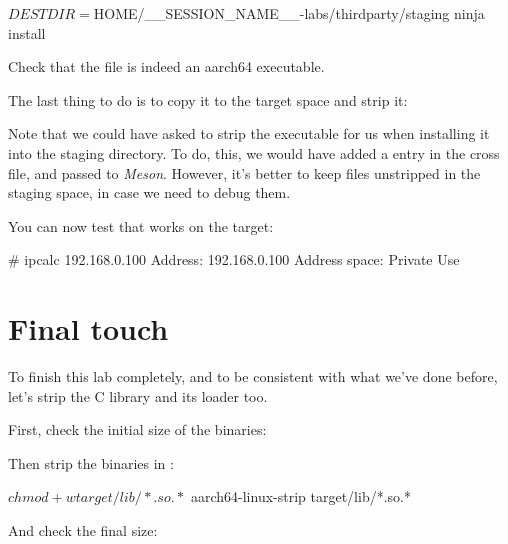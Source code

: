 \begin{bashinput}
$ DESTDIR=$HOME/__SESSION_NAME__-labs/thirdparty/staging ninja install
\end{bashinput}

Check that the  file is indeed an aarch64
executable.

The last thing to do is to copy it to the target space and strip it:


Note that we could have asked  to strip the
executable for us when installing it into the staging directory.
To do, this, we would have added a  entry in the cross file,
and passed  to {\em Meson}. However, it's better to keep
files unstripped in the staging space, in case we need to debug them.

You can now test that  works on the target:

\begin{bashinput}
# ipcalc 192.168.0.100
Address:	192.168.0.100
Address space:	Private Use
\end{bashinput}

\section{Final touch}

To finish this lab completely, and to be consistent with what we've done before,
let's strip the C library and its loader too.

First, check the initial size of the binaries:

Then strip the binaries in :
\begin{bashinput}
$ chmod +w target/lib/*.so.*
$ aarch64-linux-strip target/lib/*.so.*
\end{bashinput}

And check the final size:

